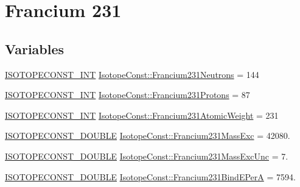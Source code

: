 \hypertarget{group___isotope_const-_francium-_fr231}{}\section{Francium 231}
\label{group___isotope_const-_francium-_fr231}
\subsection*{Variables}
\begin{DoxyCompactItemize}
\item 
\mbox{\hyperlink{group___isotope_const-_macros_ga5f18360b3e99483a35c32d789e62621c}{I\+S\+O\+T\+O\+P\+E\+C\+O\+N\+S\+T\+\_\+\+I\+NT}} \mbox{\hyperlink{group___isotope_const-_francium-_fr231_ga1695e87ca03404f39a5b95726589c79f}{Isotope\+Const\+::\+Francium231\+Neutrons}} = 144
\item 
\mbox{\hyperlink{group___isotope_const-_macros_ga5f18360b3e99483a35c32d789e62621c}{I\+S\+O\+T\+O\+P\+E\+C\+O\+N\+S\+T\+\_\+\+I\+NT}} \mbox{\hyperlink{group___isotope_const-_francium-_fr231_ga0cc63d0e035cc49743c78d02720019c0}{Isotope\+Const\+::\+Francium231\+Protons}} = 87
\item 
\mbox{\hyperlink{group___isotope_const-_macros_ga5f18360b3e99483a35c32d789e62621c}{I\+S\+O\+T\+O\+P\+E\+C\+O\+N\+S\+T\+\_\+\+I\+NT}} \mbox{\hyperlink{group___isotope_const-_francium-_fr231_gac36a7d0bfe4f49a828673710e8c5387d}{Isotope\+Const\+::\+Francium231\+Atomic\+Weight}} = 231
\item 
\mbox{\hyperlink{group___isotope_const-_macros_ga8f45a7272ce02c0b4c65c44636ed719a}{I\+S\+O\+T\+O\+P\+E\+C\+O\+N\+S\+T\+\_\+\+D\+O\+U\+B\+LE}} \mbox{\hyperlink{group___isotope_const-_francium-_fr231_ga9ba9680f8aad543eef5fa1c40e7799d8}{Isotope\+Const\+::\+Francium231\+Mass\+Exc}} = 42080.
\item 
\mbox{\hyperlink{group___isotope_const-_macros_ga8f45a7272ce02c0b4c65c44636ed719a}{I\+S\+O\+T\+O\+P\+E\+C\+O\+N\+S\+T\+\_\+\+D\+O\+U\+B\+LE}} \mbox{\hyperlink{group___isotope_const-_francium-_fr231_ga8c7d7ab6243be0468989dc3614eb9c80}{Isotope\+Const\+::\+Francium231\+Mass\+Exc\+Unc}} = 7.
\item 
\mbox{\hyperlink{group___isotope_const-_macros_ga8f45a7272ce02c0b4c65c44636ed719a}{I\+S\+O\+T\+O\+P\+E\+C\+O\+N\+S\+T\+\_\+\+D\+O\+U\+B\+LE}} \mbox{\hyperlink{group___isotope_const-_francium-_fr231_gaf126fa3a0bc3f3ec19ea1e0f6cc70e8d}{Isotope\+Const\+::\+Francium231\+Bind\+E\+PerA}} = 7594.
\item 

\end{DoxyCompactItemize}
